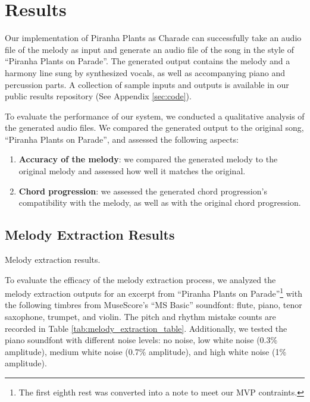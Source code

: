 \section{Results}
\label{sec:results}

Our implementation of Piranha Plants as Charade can successfully take an audio file of the melody as input and generate an audio file of the song in the style of ``Piranha Plants on Parade''. The generated output contains the melody and a harmony line sung by synthesized vocals, as well as accompanying piano and percussion parts. A collection of sample inputs and outputs is available in our public results repository (See Appendix \ref{sec:code}).

To evaluate the performance of our system, we conducted a qualitative analysis of the generated audio files. We compared the generated output to the original song, ``Piranha Plants on Parade'', and assessed the following aspects:
\begin{enumerate}
    \item \textbf{Accuracy of the melody}: we compared the generated melody to the original melody and assessed how well it matches the original.
    \item \textbf{Chord progression}: we assessed the generated chord progression's compatibility with the melody, as well as with the original chord progression.
\end{enumerate}

\subsection{Melody Extraction Results}
\label{sec:melody_extraction_results}

\begin{table} %
	\caption{Melody extraction results.}
	\centering
	
	\label{tab:melody_extraction_table}
\end{table}
To evaluate the efficacy of the melody extraction process, we analyzed the melody extraction outputs for an excerpt from ``Piranha Plants on Parade''\footnote{The first eighth rest was converted into a note to meet our MVP contraints.} with the following timbres from MuseScore's ``MS Basic'' soundfont: flute, piano, tenor saxophone, trumpet, and violin. The pitch and rhythm mistake counts are recorded in Table \ref{tab:melody_extraction_table}. Additionally, we tested the piano soundfont with different noise levels: no noise, low white noise (0.3\% amplitude), medium white noise (0.7\% amplitude), and high white noise (1\% amplitude).


